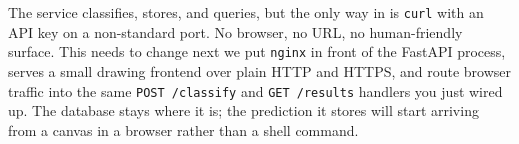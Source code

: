 
 The service classifies, stores, and
queries, but the only way in is \texttt{curl} with an API key on a
non-standard port. No browser, no URL, no human-friendly surface. This needs to change
next we put \texttt{nginx} in front of the FastAPI process, serves a small
drawing frontend over plain HTTP and HTTPS, and route browser traffic
into the same \texttt{POST /classify} and \texttt{GET /results} handlers
you just wired up. The database stays where it is; the prediction it
stores will start arriving from a canvas in a browser rather than a
shell command.
